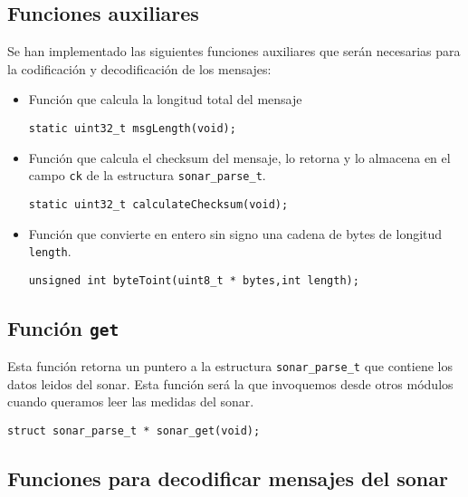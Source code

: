 \subsection{Funciones auxiliares}
Se han implementado las siguientes funciones auxiliares que serán necesarias para la codificación y decodificación de los mensajes:
\begin{itemize}
	\item Función que calcula la longitud total del mensaje
	\begin{lstlisting}[style=C]
		static uint32_t msgLength(void);
	\end{lstlisting}	

	\item Función que calcula el checksum del mensaje, lo retorna y lo almacena en el campo \texttt{ck} de la estructura \texttt{sonar\_parse\_t}.
	\begin{lstlisting}[style=C]
	static uint32_t calculateChecksum(void);
	\end{lstlisting}
	
		\item Función que convierte en entero sin signo una cadena de bytes de longitud \texttt{length}.
	\begin{lstlisting}[style=C]
	unsigned int byteToint(uint8_t * bytes,int length);
	\end{lstlisting}
	
\end{itemize}


\subsection{Función \texttt{get}}
Esta función retorna un puntero a la estructura \texttt{sonar\_parse\_t} que contiene los datos leidos del sonar.	Esta función será la que invoquemos desde otros módulos cuando queramos leer las medidas del sonar.

	\begin{lstlisting}[style=C]
struct sonar_parse_t * sonar_get(void);
	\end{lstlisting}
	
	
\subsection{Funciones para decodificar mensajes del sonar}
	
